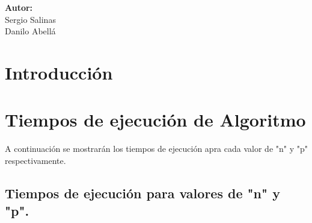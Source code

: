 \documentclass[12pt,letterpaper]{scrartcl}
\begin{document}
\begin{titlepage}
\begin{center}
\begin{minipage}[l]{0.4\textwidth}
			\begin{flushright}

				\textbf{\textsf{Autor:}}\\
				\linespread{1}
				\large Sergio Salinas\\
				\large Danilo Abellá\\

			\end{flushright}
		\end{minipage}

	\end{center}

\end{titlepage}



\newpage
\section*{Introducción}


\section{Tiempos de ejecución de Algoritmo}

A continuación se mostrarán los tiempos de ejecución apra cada valor de "n" y "p" respectivamente.

\subsection{Tiempos de ejecución para valores de "n" y "p".}
\end{document}
